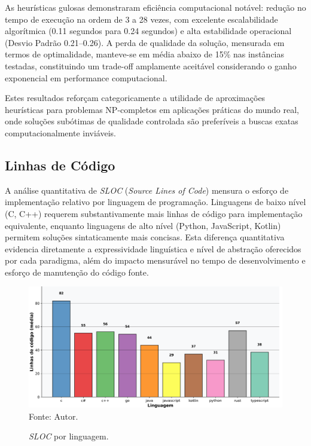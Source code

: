\documentclass[12pt,a4paper]{article}
\newcommand{\eng}[1]{\textit{#1}}
\begin{document}
As heurísticas gulosas demonstraram eficiência computacional notável: redução no tempo de execução na ordem de 3 a 28 vezes, com excelente escalabilidade algorítmica (0.11 segundos para 0.24 segundos) e alta estabilidade operacional (Desvio Padrão 0.21--0.26). A perda de qualidade da solução, mensurada em termos de optimalidade, manteve-se em média abaixo de 15\% nas instâncias testadas, constituindo um trade-off amplamente aceitável considerando o ganho exponencial em performance computacional.

Estes resultados reforçam categoricamente a utilidade de aproximações heurísticas para problemas NP-completos em aplicações práticas do mundo real, onde soluções subótimas de qualidade controlada são preferíveis a buscas exatas computacionalmente inviáveis.


\subsection{Linhas de Código}

A análise quantitativa de \eng{SLOC} (\eng{Source Lines of Code}) mensura o esforço de implementação relativo por linguagem de programação. Linguagens de baixo nível (C, C++) requerem substantivamente mais linhas de código para implementação equivalente, enquanto linguagens de alto nível (Python, JavaScript, Kotlin) permitem soluções sintaticamente mais concisas. Esta diferença quantitativa evidencia diretamente a expressividade linguística e nível de abstração oferecidos por cada paradigma, além do impacto mensurável no tempo de desenvolvimento e esforço de manutenção do código fonte.

\begin{figure}[H]
\caption{\eng{SLOC} por linguagem.}
\centering
\includegraphics[width=\textwidth]{img/linhas_linguagem.png}
\label{fig:sloc}
\centering
\small Fonte: Autor.
\end{figure}
\end{document}
